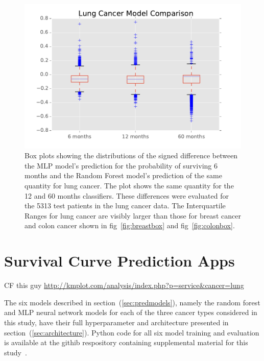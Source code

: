 \documentclass[a4paper,11pt]{article}
\begin{document}
\begin{figure}[tbp]
\centering 
\begin{center}
\includegraphics[width=.90\textwidth,origin=c]{lungbox.pdf}
\caption{\label{fig:lungbox} Box plots showing the distributions of the signed difference between the MLP model's prediction for the probability of surviving 6 months and the Random Forest model's prediction of the same quantity for lung cancer. The plot shows the same quantity for the 12 and 60 months classifiers. These differences were evaluated for the 5313 test patients in the lung cancer data. The Interquartile Ranges for lung cancer are visibly larger than those for breast cancer and colon cancer shown in fig~\ref{fig:breastbox} and fig~\ref{fig:colonbox}.}
\end{center}
\end{figure}










\section{Survival Curve Prediction Apps}
\label{sec:apps}


CF this guy \url{http://kmplot.com/analysis/index.php?p=service&cancer=lung}


The six models described in section~(\ref{sec:predmodels}), namely the random forest and MLP neural network models for each of the three cancer types considered in this study, have their full hyperparameter and architecture presented in section~(\ref{sec:architecture}). Python code for all six model training and evaluation is available at the githib respository containing supplemental material for this study~\cite{supp}.
\end{document}
